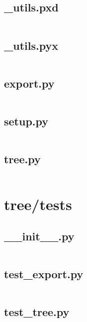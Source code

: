 \documentclass{article}
\begin{document}
\subsection{\_utils.pxd}
\inputminted{cython}{/home/dufferzafar/dev/@clones/scikit-learn/sklearn/tree/_utils.pxd}
\newpage

\subsection{\_utils.pyx}
\inputminted{cython}{/home/dufferzafar/dev/@clones/scikit-learn/sklearn/tree/_utils.pyx}
\newpage

\subsection{export.py}
\inputminted{python}{/home/dufferzafar/dev/@clones/scikit-learn/sklearn/tree/export.py}
\newpage

\subsection{setup.py}
\inputminted{python}{/home/dufferzafar/dev/@clones/scikit-learn/sklearn/tree/setup.py}
\newpage

\subsection{tree.py}
\inputminted{python}{/home/dufferzafar/dev/@clones/scikit-learn/sklearn/tree/tree.py}
\newpage

\section{tree/tests}

\subsection{\_\_init\_\_.py}
\inputminted{python}{/home/dufferzafar/dev/@clones/scikit-learn/sklearn/tree/tests/__init__.py}
\newpage

\subsection{test\_export.py}
\inputminted{python}{/home/dufferzafar/dev/@clones/scikit-learn/sklearn/tree/tests/test_export.py}
\newpage

\subsection{test\_tree.py}
\inputminted{python}{/home/dufferzafar/dev/@clones/scikit-learn/sklearn/tree/tests/test_tree.py}
\newpage
\end{document}
